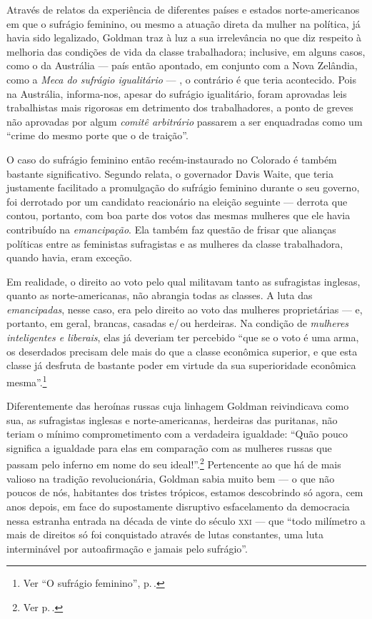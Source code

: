 Através de relatos da experiência de diferentes países e estados
norte-americanos em que o sufrágio feminino, ou mesmo a atuação direta
da mulher na política, já havia sido legalizado, Goldman traz à luz a
sua irrelevância no que diz respeito à melhoria das condições de vida da
classe trabalhadora; inclusive, em alguns casos, como o da Austrália ---
país então apontado, em conjunto com a Nova Zelândia, como a \textit{Meca do
sufrágio igualitário} --- , o contrário é que teria acontecido. Pois na
Austrália, informa-nos, apesar do sufrágio igualitário, foram
aprovadas leis trabalhistas mais rigorosas em detrimento dos
trabalhadores, a ponto de greves não aprovadas por algum \textit{comitê
arbitrário} passarem a ser enquadradas como um ``crime do mesmo porte
que o de traição''.

O caso do sufrágio feminino então recém-instaurado
no Colorado é também bastante significativo. Segundo relata, o
governador Davis Waite, que teria justamente facilitado a promulgação do
sufrágio feminino durante o seu governo, foi derrotado por um candidato
reacionário na eleição seguinte --- derrota que contou, portanto, com boa
parte dos votos das mesmas mulheres que ele havia contribuído na
\textit{emancipação}. Ela também faz questão de frisar que alianças políticas
entre as feministas sufragistas e as mulheres da classe trabalhadora,
quando havia, eram exceção.

Em realidade, o direito ao voto pelo qual
militavam tanto as sufragistas inglesas, quanto as
norte-americanas, não abrangia todas as classes. A luta das
\textit{emancipadas}, nesse caso, era pelo direito ao voto das mulheres
proprietárias --- e, portanto, em geral, brancas, casadas e/\,ou herdeiras.
Na condição de \textit{mulheres inteligentes e liberais}, elas já deveriam ter percebido ``que se o voto
é uma arma, os deserdados precisam dele mais do que a classe econômica
superior, e que esta classe já desfruta de bastante poder em virtude da
sua superioridade econômica mesma''.\footnote{Ver ``O sufrágio feminino'', p.\,\pageref{virtude}.}

Diferentemente das heroínas russas
cuja linhagem Goldman reivindicava como sua, as sufragistas inglesas e
norte-americanas, herdeiras das puritanas, não teriam o mínimo
comprometimento com a verdadeira igualdade: ``Quão pouco significa a
igualdade para elas em comparação com as mulheres russas que passam pelo
inferno em nome do seu ideal!''.\footnote{Ver p.\,\pageref{russas}.} Pertencente ao que há de mais valioso na
tradição revolucionária, Goldman sabia muito bem --- o que não poucos de
nós, habitantes dos tristes trópicos, estamos descobrindo só agora, cem
anos depois, em face do supostamente disruptivo esfacelamento da
democracia nessa estranha entrada na década de vinte do século
\textsc{xxi} --- que ``todo milímetro a mais de direitos só foi conquistado através
de lutas constantes, uma luta interminável por autoafirmação e jamais
pelo sufrágio''.

